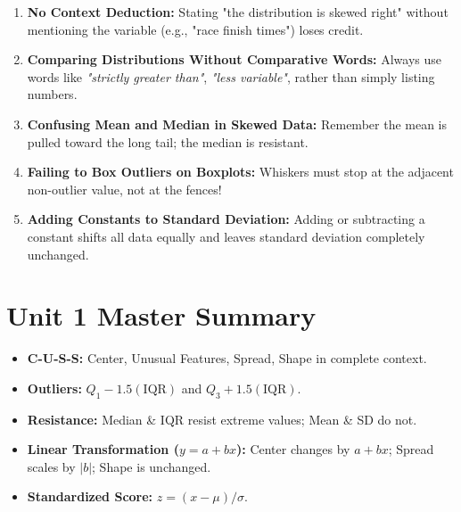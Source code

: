 \begin{trapbox}
\begin{enumerate}[leftmargin=1.2em]
  \item \textbf{No Context Deduction:} Stating "the distribution is skewed right" without mentioning the variable (e.g., "race finish times") loses credit.
  \item \textbf{Comparing Distributions Without Comparative Words:} Always use words like \textit{"strictly greater than"}, \textit{"less variable"}, rather than simply listing numbers.
  \item \textbf{Confusing Mean and Median in Skewed Data:} Remember the mean is pulled toward the long tail; the median is resistant.
  \item \textbf{Failing to Box Outliers on Boxplots:} Whiskers must stop at the adjacent non-outlier value, not at the fences!
  \item \textbf{Adding Constants to Standard Deviation:} Adding or subtracting a constant shifts all data equally and leaves standard deviation completely unchanged.
\end{enumerate}
\end{trapbox}
\section{Unit 1 Master Summary}
\begin{lessonbox}
\begin{itemize}[leftmargin=1.2em]
  \item \textbf{C-U-S-S:} Center, Unusual Features, Spread, Shape in complete context.
  \item \textbf{Outliers:} $Q_1 - 1.5(\text{IQR})$ and $Q_3 + 1.5(\text{IQR})$.
  \item \textbf{Resistance:} Median \& IQR resist extreme values; Mean \& SD do not.
  \item \textbf{Linear Transformation ($y = a + bx$):} Center changes by $a + bx$; Spread scales by $|b|$; Shape is unchanged.
  \item \textbf{Standardized Score:} $z = (x - \mu)/\sigma$.
\end{itemize}
\end{lessonbox}
\clearpage
